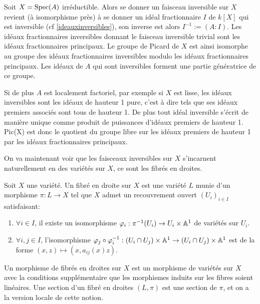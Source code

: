 \begin{ex}\label{expicaff}
Soit $X=\operatorname{Spec} (A)$ irréductible. Alors se donner un faisceau inversible sur $X$ revient (à isomorphisme près) à se donner un idéal fractionnaire $I$ de $k[X]$ qui est inversible (cf \ref{ideauxinversibles}), son inverse est alors $I^{-1}:=(A:I)$. Les idéaux fractionnaires inversibles donnant le faisceau inversible trivial sont les idéaux fractionnaires principaux. Le groupe de Picard de $X$ est ainsi isomorphe au groupe des idéaux fractionnaires inversibles modulo les idéaux fractionnaires principaux. Les idéaux de $A$ qui sont inversibles forment une partie génératrice de ce groupe. 

Si de plus $A$ est localement factoriel, par exemple si $X$ est lisse, les idéaux inversibles sont les idéaux de hauteur 1 pure, c'est à dire tels que ses idéaux premiers associés sont tous de hauteur 1. De plus tout idéal inversible s'écrit de manière unique comme produit de puissances d'idéaux premiers de hauteur 1. Pic(X) est donc le quotient du groupe libre sur les idéaux premiers de hauteur 1 par les idéaux fractionnaires principaux.
\end{ex}

On va maintenant voir que les faisceaux inversibles sur $X$ s'incarnent naturellement en des variétés sur $X$, ce sont les fibrés en droites.

\begin{defn}\label{linebundle}
Soit $X$ une variété. Un fibré en droite sur $X$ est une variété $L$ munie d'un morphisme $\pi:L\rightarrow X$ tel que $X$ admet un recouvrement ouvert $(U_i)_{i\in I}$ satisfaisant:

\begin{enumerate}
\item $\forall i\in I$, il existe un isomorphisme $\varphi_i :\pi^{-1}(U_i)\rightarrow U_i\times\mathbb{A}^1$ de variétés sur $U_i$.
\item $\forall i, j\in I$, l'isomorphisme $\varphi_j\circ \varphi_i^{-1}: (U_i\cap U_j)\times \mathbb{A}^1\rightarrow (U_i\cap U_j)\times \mathbb{A}^1$ est de la forme $(x, z)\mapsto (x, a_{ij}(x)z)$.
\end{enumerate}
Un morphisme de fibrés en droites sur $X$ est un morphisme de variétés sur $X$ avec la conditions supplémentaire que les morphismes induits sur les fibres soient linéaires.
Une section d'un fibré en droites $(L, \pi)$ est une section de $\pi$, et on a la version locale de cette notion.
\end{defn}

